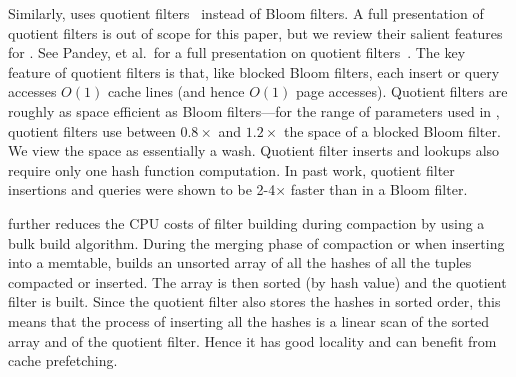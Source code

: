 Similarly, \sysname uses quotient
filters~\cite{DBLP:conf/hotstorage/BenderFJKMMSSZ11,DBLP:journals/pvldb/BenderFJKKMMSSZ12,DBLP:conf/sigmod/PandeyBJP17}
instead of Bloom filters.  A full presentation of quotient filters is
out of scope for this paper, but we review their salient features for
\sysname.  See Pandey, et al.\ for a full presentation on quotient
filters~\cite{DBLP:conf/sigmod/PandeyBJP17}.  The key feature of
quotient filters is that, like blocked Bloom filters, each insert or
query accesses $O(1)$ cache lines (and hence $O(1)$ page accesses).
Quotient filters are roughly as space efficient as Bloom filters---for
the range of parameters used in \sysname, quotient filters use between
$0.8\times$ and $1.2\times$ the space of a blocked Bloom filter.  We view
the space as essentially a wash.  Quotient filter inserts and lookups
also require only one hash function computation.  In past work,
quotient filter insertions and queries were shown to be 2-4$\times$
faster than in a Bloom filter.




\sysname further reduces the CPU costs of filter building during compaction by
using a bulk build algorithm.  During the merging phase of compaction or when
inserting into a memtable, \sysname builds an unsorted array of all the hashes
of all the tuples compacted or inserted. The array is then sorted (by hash
value) and the quotient filter is built.  Since the quotient filter also stores
the hashes in sorted order, this means that the process of inserting all the
hashes is a linear scan of the sorted array and of the quotient filter.  Hence
it has good locality and can benefit from cache prefetching.  

